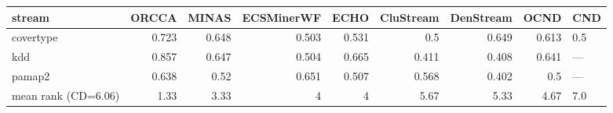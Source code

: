\begin{tabular}{lrrrrrrrl}
\hline
 stream              &   ORCCA &   MINAS &   ECSMinerWF &   ECHO &   CluStream &   DenStream &   OCND & CND   \\
\hline
 covertype           &   0.723 &   0.648 &        0.503 &  0.531 &       0.5   &       0.649 &  0.613 & 0.5   \\
 kdd                 &   0.857 &   0.647 &        0.504 &  0.665 &       0.411 &       0.408 &  0.641 & ---   \\
 pamap2              &   0.638 &   0.52  &        0.651 &  0.507 &       0.568 &       0.402 &  0.5   & ---   \\
 mean rank (CD=6.06) &   1.33  &   3.33  &        4     &  4     &       5.67  &       5.33  &  4.67  & 7.0   \\
\hline
\end{tabular}